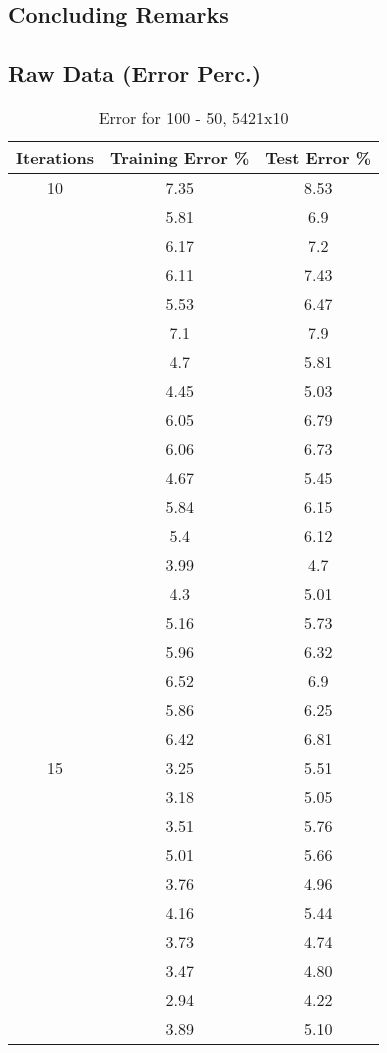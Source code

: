\documentclass[12pt]{article}
\begin{document}
\subsection*{Concluding Remarks}

\subsection*{Raw Data (Error Perc.)}
\begin{table}[h]
	\begin{center}
		\caption{Error for 100 - 50, 5421x10}
		\label{tab:table2}
		\begin{tabular}{|c|c|c|}
			\hline
			\textbf{Iterations} & \textbf{Training Error \%} & \textbf{Test Error \%} \\
			\hline
			10 & 7.35 & 8.53\\
			& 5.81 & 6.9\\
			& 6.17 & 7.2\\
			& 6.11 & 7.43\\
			& 5.53 & 6.47 \\
			& 7.1 & 7.9 \\
			& 4.7 & 5.81 \\
			& 4.45 & 5.03 \\
			& 6.05 & 6.79 \\
			& 6.06 & 6.73 \\
			& 4.67 & 5.45 \\
			& 5.84 & 6.15 \\
			& 5.4 & 6.12 \\
			& 3.99 & 4.7 \\
			& 4.3 & 5.01 \\
			& 5.16 & 5.73 \\
			& 5.96 & 6.32 \\
			& 6.52 & 6.9 \\
			& 5.86 & 6.25 \\
			& 6.42 & 6.81 \\
			\hline
			15 & 3.25 & 5.51\\
			& 3.18 & 5.05\\
			& 3.51 & 5.76\\
			& 5.01 & 5.66\\
			& 3.76 & 4.96\\
			& 4.16 & 5.44\\
			& 3.73 & 4.74\\
			& 3.47 & 4.80\\
			& 2.94 & 4.22\\
			& 3.89 & 5.10\\

\end{tabular}
\end{center}
\end{table}
\end{document}
